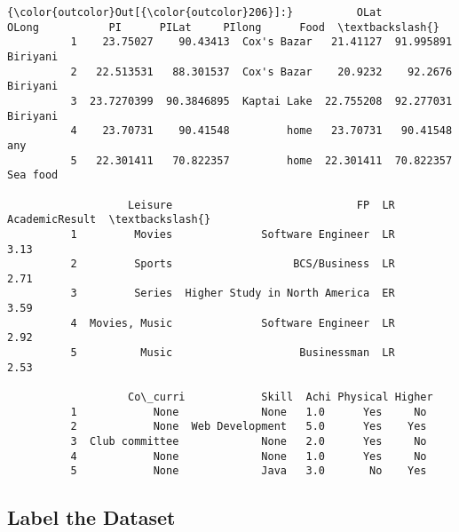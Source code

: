 \documentclass[11pt]{article}
\begin{document}
\begin{Verbatim}[commandchars=\\\{\}]
{\color{outcolor}Out[{\color{outcolor}206}]:}          OLat       OLong           PI      PILat     PIlong      Food  \textbackslash{}
          1    23.75027    90.43413  Cox's Bazar   21.41127  91.995891  Biriyani   
          2   22.513531   88.301537  Cox's Bazar    20.9232    92.2676  Biriyani   
          3  23.7270399  90.3846895  Kaptai Lake  22.755208  92.277031  Biriyani   
          4    23.70731    90.41548         home   23.70731   90.41548       any   
          5   22.301411   70.822357         home  22.301411  70.822357  Sea food   
          
                   Leisure                             FP  LR  AcademicResult  \textbackslash{}
          1         Movies              Software Engineer  LR            3.13   
          2         Sports                   BCS/Business  LR            2.71   
          3         Series  Higher Study in North America  ER            3.59   
          4  Movies, Music              Software Engineer  LR            2.92   
          5          Music                    Businessman  LR            2.53   
          
                   Co\_curri            Skill  Achi Physical Higher  
          1            None             None   1.0      Yes     No  
          2            None  Web Development   5.0      Yes    Yes  
          3  Club committee             None   2.0      Yes     No  
          4            None             None   1.0      Yes     No  
          5            None             Java   3.0       No    Yes  
\end{Verbatim}
            
    \hypertarget{label-the-dataset}{%
\subsection{Label the Dataset}\label{label-the-dataset}}
\end{document}
